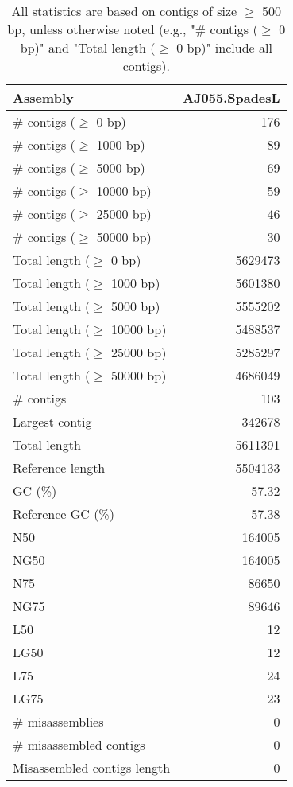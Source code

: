 \documentclass[12pt,a4paper]{article}
\begin{document}
\begin{table}[ht]
\begin{center}
\caption{All statistics are based on contigs of size $\geq$ 500 bp, unless otherwise noted (e.g., "\# contigs ($\geq$ 0 bp)" and "Total length ($\geq$ 0 bp)" include all contigs).}
\begin{tabular}{|l*{1}{|r}|}
\hline
Assembly & AJ055.SpadesL \\ \hline
\# contigs ($\geq$ 0 bp) & 176 \\ \hline
\# contigs ($\geq$ 1000 bp) & 89 \\ \hline
\# contigs ($\geq$ 5000 bp) & 69 \\ \hline
\# contigs ($\geq$ 10000 bp) & 59 \\ \hline
\# contigs ($\geq$ 25000 bp) & 46 \\ \hline
\# contigs ($\geq$ 50000 bp) & 30 \\ \hline
Total length ($\geq$ 0 bp) & 5629473 \\ \hline
Total length ($\geq$ 1000 bp) & 5601380 \\ \hline
Total length ($\geq$ 5000 bp) & 5555202 \\ \hline
Total length ($\geq$ 10000 bp) & 5488537 \\ \hline
Total length ($\geq$ 25000 bp) & 5285297 \\ \hline
Total length ($\geq$ 50000 bp) & 4686049 \\ \hline
\# contigs & 103 \\ \hline
Largest contig & 342678 \\ \hline
Total length & 5611391 \\ \hline
Reference length & 5504133 \\ \hline
GC (\%) & 57.32 \\ \hline
Reference GC (\%) & 57.38 \\ \hline
N50 & 164005 \\ \hline
NG50 & 164005 \\ \hline
N75 & 86650 \\ \hline
NG75 & 89646 \\ \hline
L50 & 12 \\ \hline
LG50 & 12 \\ \hline
L75 & 24 \\ \hline
LG75 & 23 \\ \hline
\# misassemblies & 0 \\ \hline
\# misassembled contigs & 0 \\ \hline
Misassembled contigs length & 0 \\ \hline

\end{tabular}
\end{center}
\end{table}
\end{document}
